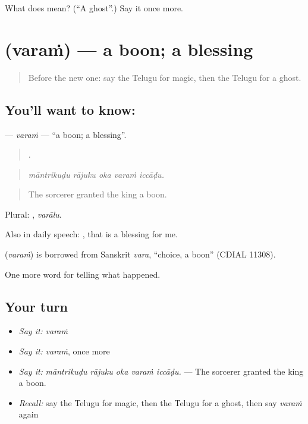 \begin{tcolorbox}[breakable,colback=teal!4,colframe=teal!35!black,title={Before you move on}]
What does  mean? (\textquotedblleft{}A ghost\textquotedblright{}.) Say it once more.
\end{tcolorbox}
\section[\texorpdfstring{\te{వరం} (varaṁ)}{వరం (varaṁ)}]{ (varaṁ) — a boon; a blessing}

\label{lesson:TE-C371-varam}



\begin{quote}
Before the new one: say the Telugu for magic, then the Telugu for a ghost.
\end{quote}

\subsection*{You'll want to know: }
\textbf{} — \emph{varaṁ} — \textquotedblleft{}a boon; a blessing\textquotedblright{}.

\begin{quote}
    .
\end{quote}

\begin{quote}
\emph{māntrikuḍu rājuku oka varaṁ iccāḍu.}
\end{quote}

\begin{quote}
The sorcerer granted the king a boon.
\end{quote}

Plural: , \emph{varālu}.

Also in daily speech:   , that is a blessing for me.

\begin{cousinweb}
\textbf{} (\emph{varaṁ}) is borrowed from Sanskrit \emph{vara}, \textquotedblleft{}choice, a boon\textquotedblright{} (CDIAL 11308).
\end{cousinweb}

\begin{grammarlens}[title={What you've built}]
One more word for telling what happened.
\end{grammarlens}

\subsection*{Your turn}
\begin{itemize}
\raggedright
  \item \emph{Say it:} \emph{varaṁ}
  \item \emph{Say it:} \emph{varaṁ}, once more
  \item \emph{Say it:} \emph{māntrikuḍu rājuku oka varaṁ iccāḍu.} — The sorcerer granted the king a boon.
  \item \emph{Recall:} say the Telugu for magic, then the Telugu for a ghost, then say \emph{varaṁ} again
\end{itemize}

